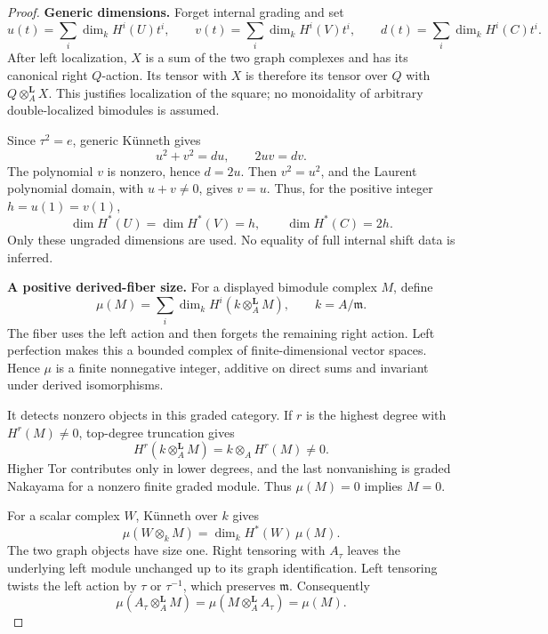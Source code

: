 \begin{proof}
\par\smallskip\noindent\textbf{Generic dimensions.}\quad
Forget internal grading and set
\[
 u(t)=\sum_i\dim_kH^i(U)t^i,\qquad
 v(t)=\sum_i\dim_kH^i(V)t^i,\qquad
 d(t)=\sum_i\dim_kH^i(C)t^i.
\]
After left localization, \(X\) is a sum of the two
graph complexes and has its canonical right \(Q\)-action.
Its tensor with \(X\) is therefore its tensor over
\(Q\) with \(Q\otimes_A^{\mathbf L}X\).
This justifies localization of the square; no
monoidality of arbitrary double-localized bimodules
is assumed.

Since \(\tau^2=e\), generic K\"unneth gives
\[
                  u^2+v^2=du,\qquad 2uv=dv.
\]
The polynomial \(v\) is nonzero, hence \(d=2u\).
Then \(v^2=u^2\), and the Laurent polynomial domain,
with \(u+v\ne0\), gives \(v=u\).
Thus, for the positive integer \(h=u(1)=v(1)\),
\begin{equation}\label{eq:invisibleScalarDimensions}
 \dim H^*(U)=\dim H^*(V)=h,\qquad
                         \dim H^*(C)=2h.
\end{equation}
Only these ungraded dimensions are used.
No equality of full internal shift data is inferred.

\par\smallskip\noindent\textbf{A positive derived-fiber size.}\quad
For a displayed bimodule complex \(M\), define
\begin{equation}\label{eq:derivedOriginSize}
 \mu(M)=\sum_i\dim_k
             H^i(k\otimes_A^{\mathbf L}M),
 \qquad k=A/\mathfrak m.
\end{equation}
The fiber uses the left action and then forgets the
remaining right action.
Left perfection makes this a bounded complex of
finite-dimensional vector spaces. Hence \(\mu\) is
a finite nonnegative integer, additive on direct sums
and invariant under derived isomorphisms.

It detects nonzero objects in this graded category.
If \(r\) is the highest degree with \(H^r(M)\ne0\),
top-degree truncation gives
\[
 H^r(k\otimes_A^{\mathbf L}M)
       =k\otimes_AH^r(M)\ne0.
\]
Higher Tor contributes only in lower degrees, and the
last nonvanishing is graded Nakayama for a nonzero
finite graded module. Thus \(\mu(M)=0\) implies \(M=0\).

For a scalar complex \(W\), K\"unneth over \(k\) gives
\begin{equation}\label{eq:derivedOriginScalarSize}
 \mu(W\otimes_kM)=\dim_kH^*(W)\,\mu(M).
\end{equation}
The two graph objects have size one.
Right tensoring with \(A_\tau\) leaves the underlying
left module unchanged up to its graph identification.
Left tensoring twists the left action by \(\tau\)
or \(\tau^{-1}\), which preserves \(\mathfrak m\).
Consequently
\begin{equation}\label{eq:derivedOriginGraphSize}
 \mu(A_\tau\otimes_A^{\mathbf L}M)
   =\mu(M\otimes_A^{\mathbf L}A_\tau)=\mu(M).
\end{equation}


\end{proof}

